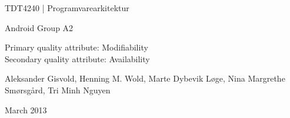 \begin{titlepage}
\begin{center}
\vspace*{1in}
{\LARGE TDT4240 | Programvarearkitektur}
\par
\vspace{1in}
{\LARGE Android Group A2}
\par
\vspace{1in}
{\LARGE Primary quality attribute: Modifiability\\Secondary quality attribute:
Availability}
\par
\vfill
\par
\vspace{0.5in}
Aleksander Gisvold, Henning M. Wold, Marte Dybevik Løge, Nina Margrethe
Smørsgård, Tri Minh Nguyen
\par
March 2013
\end{center}
\end{titlepage}
